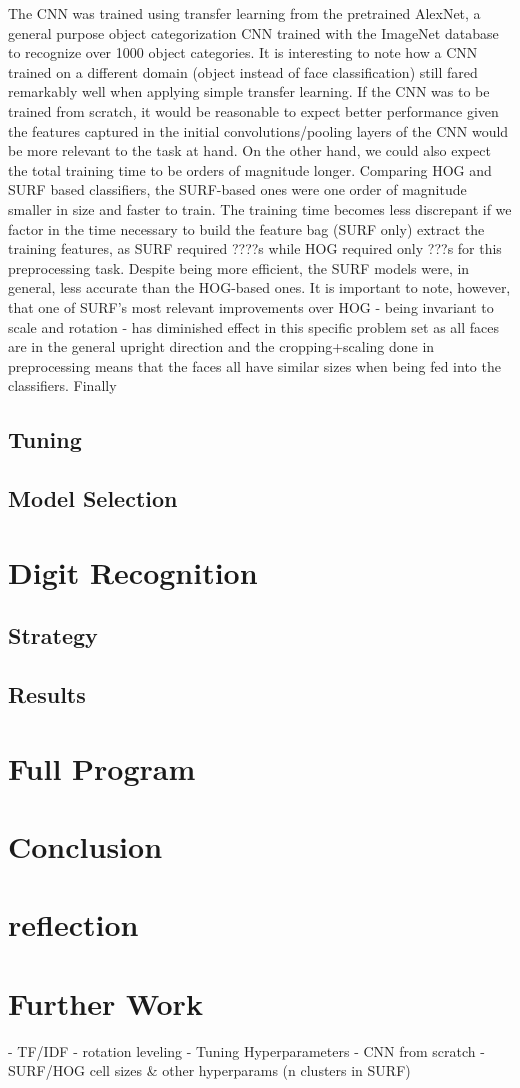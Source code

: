 \documentclass[11pt]{article}
\begin{document}
        The CNN was trained using transfer learning from the pretrained AlexNet, a general purpose object categorization CNN trained with the ImageNet database to recognize over 1000 object categories. It is interesting to note how a CNN trained on a different domain (object instead of face classification) still fared remarkably well when applying simple transfer learning. If the CNN was to be trained from scratch, it would be reasonable to expect better performance given the features captured in the initial convolutions/pooling layers of the CNN would be more relevant to the task at hand. On the other hand, we could also expect the total training time to be orders of magnitude longer.
        Comparing HOG and SURF based classifiers, the SURF-based ones were one order of magnitude smaller in size and faster to train. The training time becomes less discrepant if we factor in the time necessary to build the feature bag (SURF only) extract the training features, as SURF required ????s while HOG required only ???s for this preprocessing task. Despite being more efficient, the SURF models were, in general, less accurate than the HOG-based ones. It is important to note, however, that one of SURF's most relevant improvements over HOG - being invariant to scale and rotation - has diminished effect in this specific problem set as all faces are in the general upright direction and the cropping+scaling done in preprocessing means that the faces all have similar sizes when being fed into the classifiers.
        Finally
\subsection{Tuning}
\subsection{Model Selection}
\section{Digit Recognition}
\subsection{Strategy}
\subsection{Results}
\section{Full Program}
\section{Conclusion}
\section{reflection}
\section{Further Work}
- TF/IDF
- rotation leveling
- Tuning Hyperparameters
- CNN from scratch
- SURF/HOG cell sizes & other hyperparams (n clusters in SURF)
\end{document}
